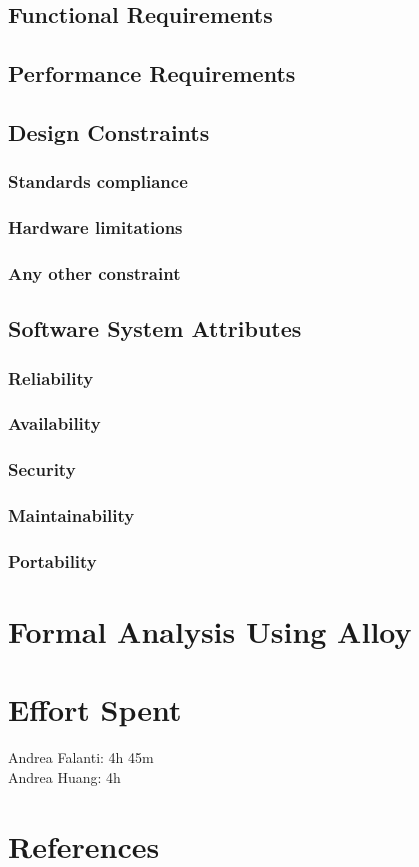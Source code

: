 \documentclass[12pt]{article}
\begin{document}
    \subsection{Functional Requirements}
    \subsection{Performance Requirements}
    \subsection{Design Constraints}
        \subsubsection{Standards compliance}
        \subsubsection{Hardware limitations}
        \subsubsection{Any other constraint}
    \subsection{Software System Attributes}
        \subsubsection{Reliability}
        \subsubsection{Availability}
        \subsubsection{Security}
        \subsubsection{Maintainability}
        \subsubsection{Portability}

\newpage
\section{Formal Analysis Using Alloy}
\section{Effort Spent}
    Andrea Falanti: 4h 45m\\
    Andrea Huang: 4h
\section{References}
\end{document}
